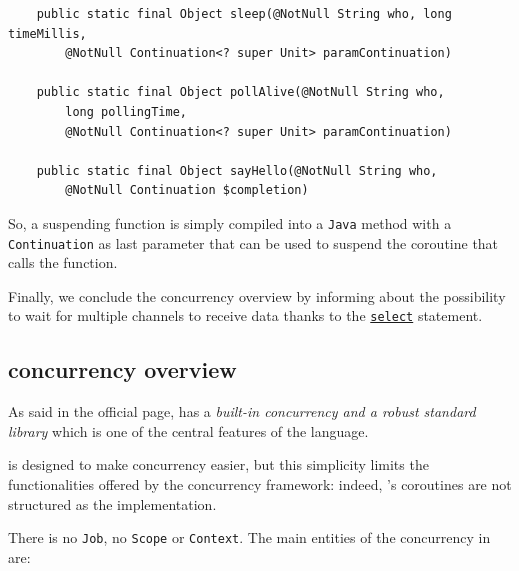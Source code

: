 \begin{lstlisting}
	public static final Object sleep(@NotNull String who, long timeMillis,
		@NotNull Continuation<? super Unit> paramContinuation)
		
	public static final Object pollAlive(@NotNull String who,
		long pollingTime,
		@NotNull Continuation<? super Unit> paramContinuation)
		
	public static final Object sayHello(@NotNull String who,
		@NotNull Continuation $completion)
\end{lstlisting}

So, a suspending function is simply compiled into a \texttt{Java} method with a \texttt{Continuation} as last parameter that can be used to suspend the coroutine that calls the function.

Finally, we conclude the \Kotlin concurrency overview by informing about the possibility to wait for multiple channels to receive data thanks to the \href{https://kotlinlang.org/docs/select-expression.html}{\texttt{select}} statement.

\subsection{\Go concurrency overview}

As said in the official page, \Go has a \textit{built-in concurrency and a robust standard library} which is one of the central features of the language.

\Go is designed to make concurrency easier, but this simplicity limits the functionalities offered by the concurrency framework: indeed, \Go 's coroutines are not structured as the \Kotlin implementation.

There is no \texttt{Job}, no \texttt{Scope} or \texttt{Context}. The main entities of the concurrency in \Go are:

